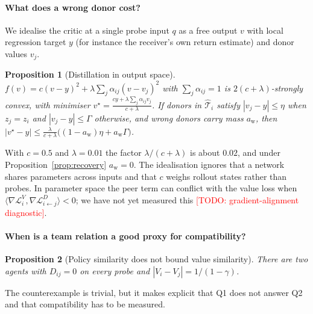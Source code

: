 \documentclass{article}
\newtheorem{proposition}{Proposition}
\theoremstyle{remark}
\newcommand{\todo}[1]{\textcolor{red}{[TODO: #1]}}
\begin{document}
\paragraph{What does a wrong donor cost?} We idealise the critic at a single probe input $q$ as a free output $v$ with local
regression target $y$ (for instance the receiver's own return estimate) and donor values $v_j$.
\begin{proposition}[Distillation in output space]
\label{prop:bias}
$f(v)=c(v-y)^2+\lambda\sum_j\alpha_{ij}(v-v_j)^2$ with $\sum_j\alpha_{ij}=1$ is $2(c+\lambda)$-strongly convex, with minimiser
$v^\star=\frac{cy+\lambda\sum_j\alpha_{ij}v_j}{c+\lambda}$. If donors in $\hat{\mathcal{T}}_i$ satisfy $|v_j-y|\le\eta$ when
$z_j=z_i$ and $|v_j-y|\le\Gamma$ otherwise, and wrong donors carry mass $a_{\mathrm{w}}$, then
$|v^\star-y|\le\frac{\lambda}{c+\lambda}\big((1-a_{\mathrm{w}})\eta+a_{\mathrm{w}}\Gamma\big)$.
\end{proposition}
With $c=0.5$ and $\lambda=0.01$ the factor $\lambda/(c+\lambda)$ is about $0.02$, and under Proposition~\ref{prop:recovery}
$a_{\mathrm{w}}=0$. The idealisation ignores that a network shares parameters across inputs and that $c$ weighs rollout states
rather than probes. In parameter space the peer term can conflict with the value loss when
$\langle\nabla\mathcal{L}^V_i,\nabla\mathcal{L}^D_{i\leftarrow j}\rangle<0$; we have not yet measured this
\todo{gradient-alignment diagnostic}.

\paragraph{When is a team relation a good proxy for compatibility?}
\begin{proposition}[Policy similarity does not bound value similarity]
\label{prop:counter}
There are two agents with $D_{ij}=0$ on every probe and $|V_i-V_j|=1/(1-\gamma)$.
\end{proposition}
The counterexample is trivial, but it makes explicit that Q1 does not answer Q2 and that compatibility has to be measured.
\end{document}
